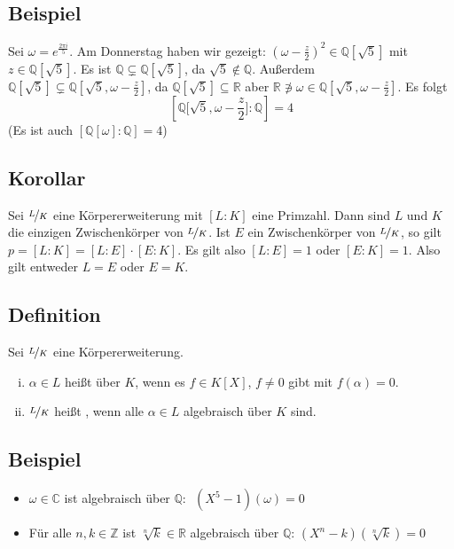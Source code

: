 \subsection[Beispiel: Grad der Körpererweiterung für die Konstruktion des $5$-Ecks]{Beispiel} %
\label{sub:1111}
Sei $\omega = e^{\frac{2 \pi  i}{5} }$. Am Donnerstag haben wir gezeigt: $(\omega - \frac{z}{2} )^2 \in \mathds{Q}[\sqrt{5}]$ mit $z \in \mathds{Q}[\sqrt{5}]$. Es ist 
$\mathds{Q} \subsetneq \mathds{Q}[\sqrt{5}]$, da $\sqrt{5} \not\in \mathds{Q}$. Außerdem $\mathds{Q}[\sqrt{5}] \subsetneq  \mathds{Q}[\sqrt{5}, \omega- \frac{z}{2}]$, da
$\mathds{Q}[\sqrt{5}] \subseteq \mathds{R}$ aber $\mathds{R} \not\ni \omega \in \mathds{Q}[\sqrt{5}, \omega- \frac{z}{2}]$. Es folgt 
\[
	\left[ \mathds{Q}\big[\sqrt{5}, \omega- \frac{z}{2} \big] : \mathds{Q}   \right] = 4
\]
(Es ist auch $[\mathds{Q}[\omega] : \mathds{Q}] = 4$)

\subsection[Korollar: Folgerung wenn der Grad prim ist]{Korollar} %
\label{sub:1112}
Sei $\nicefrac{L}{K}$ eine Körpererweiterung mit $[L:K]$ eine Primzahl. Dann sind $L$ und $K$ die einzigen Zwischenkörper von $\nicefrac{L}{K}$.
Ist $E$ ein Zwischenkörper von $\nicefrac{L}{K}$, so gilt $p = [L :K] = [L : E] \cdot [E:K]$. Es gilt also $[L :E]=1$ oder $[E:K]=1$. Also gilt entweder $L=E$ oder $E=K$.
\bewende

\subsection[Definition: algebraisches Element und algebraische Körpererweiterung]{Definition} %
\label{sub:1113}
Sei $\nicefrac{L}{K}$ eine Körpererweiterung.
\begin{enumerate}[(i)]
	\item $\alpha \in L$ heißt  über $K$, wenn es $f \in K[X]$, $f \not=0$ gibt mit $f(\alpha)=0$.
	\item $\nicefrac{L}{K}$ heißt , wenn alle $\alpha \in L$ algebraisch über $K$ sind. 
\end{enumerate}

\subsection[Beispiele für algebraische Elemente aus $\nicefrac{\mathds{C}}{\mathds{Q}}$]{Beispiel} %
\label{sub:1114}
\begin{itemize}
	\item $\omega \in \mathds{C}$ ist algebraisch über $\mathds{Q}: \enspace(X^5-1)(\omega)= 0$
	\item Für alle $n,k \in \mathds{Z}$ ist $\sqrt[n]{k} \in \mathds{R} $ algebraisch über $\mathds{Q}$: $(X^n-k)(\sqrt[n]{k}  )=0$
\end{itemize}

